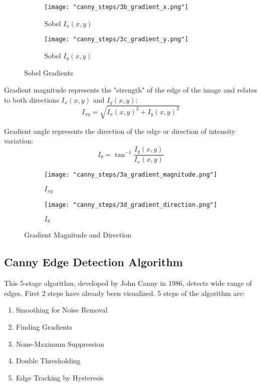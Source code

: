 \documentclass{article}
\begin{document}
	\begin{figure}[H]
		\centering
		\begin{subfigure}{0.45\textwidth}
			\centering
			\texttt{[image: "canny\_steps/3b\_gradient\_x.png"]}
			\caption{Sobel $I_x(x,y)$}
		\end{subfigure}
		\hfill
		\begin{subfigure}{0.45\textwidth}
			\centering
			\texttt{[image: "canny\_steps/3c\_gradient\_y.png"]}
			\caption{Sobel $I_y(x,y)$}
		\end{subfigure}
		\caption{Sobel Gradients}
	\end{figure}
	
	Gradient magnitude represents the "strength" of the edge of the image and relates to both directions $I_x(x,y)$ and $I_y(x,y)$: 
	$$I_{xy} = \sqrt{I_x(x,y)^2 + I_y(x,y)^2}$$
	
	Gradient angle represents the direction of the edge or direction of intensity variation: $$I_\theta = \tan^{-1} \frac{I_y(x,y)}{I_x(x,y)}$$
	
	\begin{figure}[H]
		\centering
		\begin{subfigure}{0.45\textwidth}
			\centering
			\texttt{[image: "canny\_steps/3a\_gradient\_magnitude.png"]}
			\caption{$I_{xy}$}
		\end{subfigure}
		\hfill
		\begin{subfigure}{0.45\textwidth}
			\centering
			\texttt{[image: "canny\_steps/3d\_gradient\_direction.png"]}
			\caption{$I_\theta$}
		\end{subfigure}
		\caption{Gradient Magnitude and Direction}
	\end{figure}
	
	\subsection{Canny Edge Detection Algorithm}
	
	This 5-stage algorithm, developed by John Canny in 1986, detects wide range of edges. First 2 steps have already been visualized. 5 steps of the algorithm are: 
	\begin{enumerate}
		\item Smoothing for Noise Removal
		\item Finding Gradients
		\item None-Maximum Suppression
		\item Double Thresholding
		\item Edge Tracking by Hysteresis
	\end{enumerate}
	
\end{document}

